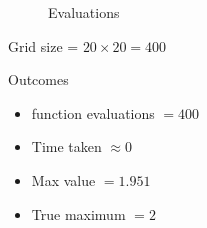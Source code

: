 \documentclass[
    xcolor={svgnames,dvipsnames},
    hyperref={colorlinks, citecolor=DeepPink4, linkcolor=DarkRed, urlcolor=DarkBlue}
    ]{beamer}  %
\newcommand{\1}{\mathbbm 1}
\begin{document}
\begin{frame}
    
    \begin{figure}
       \begin{center}
           \caption{Evaluations}
       \end{center}
    \end{figure}

\end{frame}


\begin{frame}
    
    Grid size = $20 \times 20 = 400$

    \vspace{0.5em}
    Outcomes

    \begin{itemize}
        \item function evaluations $= 400$
    \vspace{0.5em}
        \item Time taken $\approx 0$
    \vspace{0.5em}
        \item Max value $= 1.951$
    \vspace{0.5em}
        \item True maximum $= 2$
    \end{itemize}

    \vspace{0.5em}
    \vspace{0.5em}
\end{frame}
\end{document}
